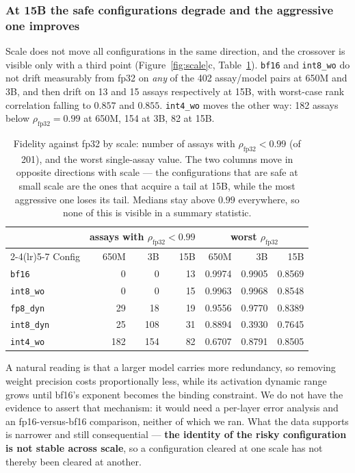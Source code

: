 \documentclass[11pt]{article}
\newcommand{\cfg}[1]{\texttt{#1}}
\begin{document}
\subsubsection{At 15B the safe configurations degrade and the aggressive one improves}

Scale does not move all configurations in the same direction, and the crossover
is visible only with a third point (Figure~\ref{fig:scale}c,
Table~\ref{tab:fid3}). \cfg{bf16} and \cfg{int8\_wo} do not drift measurably
from fp32 on \emph{any} of the 402 assay/model pairs at 650M and 3B, and then
drift on 13 and 15 assays respectively at 15B, with worst-case rank correlation
falling to $0.857$ and $0.855$. \cfg{int4\_wo} moves the other way: 182 assays
below $\rho_{\text{fp32}} = 0.99$ at 650M, 154 at 3B, 82 at 15B.

\begin{table}[htb]
\centering
\caption{Fidelity against fp32 by scale: number of assays with
$\rho_{\text{fp32}} < 0.99$ (of 201), and the worst single-assay value. The two
columns move in opposite directions with scale --- the configurations that are
safe at small scale are the ones that acquire a tail at 15B, while the most
aggressive one loses its tail. Medians stay above $0.99$ everywhere, so none of
this is visible in a summary statistic.}
\label{tab:fid3}
\small
\begin{tabular}{lrrrrrr}
\toprule
& \multicolumn{3}{c}{assays with $\rho_{\text{fp32}}<0.99$} & \multicolumn{3}{c}{worst $\rho_{\text{fp32}}$} \\
\cmidrule(lr){2-4}\cmidrule(lr){5-7}
Config & 650M & 3B & 15B & 650M & 3B & 15B \\
\midrule
\cfg{bf16}      &   0 &   0 & 13 & 0.9974 & 0.9905 & 0.8569 \\
\cfg{int8\_wo}  &   0 &   0 & 15 & 0.9963 & 0.9968 & 0.8548 \\
\cfg{fp8\_dyn}  &  29 &  18 & 19 & 0.9556 & 0.9770 & 0.8389 \\
\cfg{int8\_dyn} &  25 & 108 & 31 & 0.8894 & 0.3930 & 0.7645 \\
\cfg{int4\_wo}  & 182 & 154 & 82 & 0.6707 & 0.8791 & 0.8505 \\
\bottomrule
\end{tabular}
\end{table}

A natural reading is that a larger model carries more redundancy, so removing
weight precision costs proportionally less, while its activation dynamic range
grows until bf16's exponent becomes the binding constraint. We do not have the
evidence to assert that mechanism: it would need a per-layer error analysis and
an fp16-versus-bf16 comparison, neither of which we ran. What the data supports
is narrower and still consequential --- \textbf{the identity of the risky
configuration is not stable across scale}, so a configuration cleared at one
scale has not thereby been cleared at another.
\end{document}
